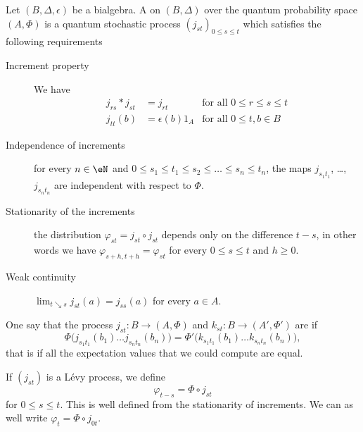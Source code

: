 \begin{definition}
	Let $(B,\Delta,\epsilon)$ be a bialgebra. A  on $(B,\Delta)$ over the quantum probability space $(A,\Phi)$ is a quantum stochastic process $(j_{st})_{0\leq s\leq t}$ which satisfies the following requirements
	\begin{description}
		\item[Increment property] We have
			\begin{subequations}
				\begin{align}
					j_{rs}*j_{st} & =j_{rt}         & \text{for all }0\leq r\leq s\leq t \\
					j_{tt}(b)     & =\epsilon(b)1_A & \text{for all }0\leq t,b\in B
				\end{align}
			\end{subequations}

		\item[Independence of increments]
			for every $n\in\eN$ and $0\leq s_1\leq t_1\leq s_2\leq\ldots\leq s_n\leq t_n$, the maps $j_{s_1t_1}$, \ldots, $j_{s_nt_n}$ are independent with respect to $\Phi$.
		\item[Stationarity of the increments]
			the distribution $\varphi_{st}=j_{st}\circ j_{st}$ depends only on the difference $t-s$, in other words we have $\varphi_{s+h,t+h}=\varphi_{st}$ for every $0\leq s\leq t$ and $h\geq 0$.
		\item[Weak continuity]
			$\lim_{t\searrow s}j_{st}(a)=j_{ss}(a)$ for every $a\in A$.
	\end{description}
\end{definition}

One say that the process $j_{st}\colon B\to (A,\Phi)$ and $k_{st}\colon B\to (A',\Phi')$ are  if
\begin{equation}
	\Phi\big( j_{s_1t_1}(b_1)\ldots j_{s_nt_n}(b_n) \big)=\Phi'\big( k_{s_1t_1}(b_1)\ldots k_{s_nt_n}(b_n) \big),
\end{equation}
that is if all the expectation values that we could compute are equal.

If $(j_{st})$ is a Lévy process, we define
\begin{equation}
	\varphi_{t-s}=\Phi\circ j_{st}
\end{equation}
for $0\leq s\leq t$. This is well defined from the stationarity of increments. We can as well write $\varphi_t=\Phi\circ j_{0t}$.

